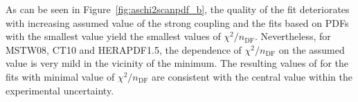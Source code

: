 As can be seen in Figure~\ref{fig:aschi2scanpdf_b}, the quality of the fit deteriorates with increasing assumed value of the strong coupling and the fits based on PDFs with the smallest \asz value yield the smallest values of $\chi^2/n_\text{DF}$. Nevertheless, for MSTW08, CT10 and HERAPDF1.5, the dependence of $\chi^2/n_\text{DF}$ on the assumed value is very mild in the vicinity of the minimum. The resulting values of \as for the fits with minimal value of $\chi^2/n_\text{DF}$ are consistent with the central value within the experimental uncertainty.

